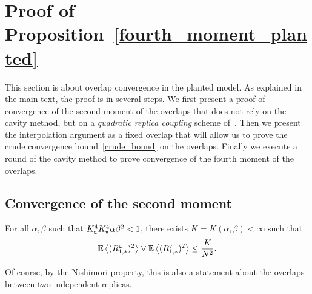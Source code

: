 \documentclass[final,12pt]{colt2018} %
\newcommand{\utt}{\textup{\texttt{u}}}
\newcommand{\vtt}{\textup{\texttt{v}}}
\begin{document}
\section{Proof of Proposition~\ref{fourth_moment_planted}} 
\label{sxn:proof_of_fourth_moment_planted}
This section is about overlap convergence in the planted model. As explained in the main text, the proof is in several steps. We first present a proof of convergence of the second moment of the overlaps that does not rely on the cavity method, but on a \emph{quadratic replica coupling} scheme of~\cite{guerra2002quadratic}. Then we present the interpolation argument as a fixed overlap that will allow us to prove the crude convergence bound~\eqref{crude_bound} on the overlaps. Finally we execute a round of the cavity method to prove convergence of the fourth moment of the overlaps. 


\subsection{Convergence of the second moment}
\label{sxn:proof_of_convergence_second_moment}
\begin{proposition}\label{second_moment_planted}
For all $\alpha,\beta$ such that $K_{\utt}^4K_{\vtt}^4\alpha\beta^2 < 1$, there exists $K = K(\alpha,\beta) <\infty$ such that
\[\E\left\langle (R^{\utt}_{1,*})^2\right\rangle \vee \E\left\langle (R^{\vtt}_{1,*})^2\right\rangle \le \frac{K}{N^2}.\]
\end{proposition}
Of course, by the Nishimori property, this is also a statement about the overlaps between two independent replicas.   
\end{document}
